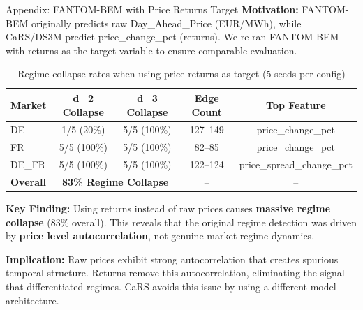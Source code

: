 \documentclass[aspectratio=169]{beamer}
\begin{document}
\begin{frame}{Appendix: FANTOM-BEM with Price Returns Target}
\textbf{Motivation:} FANTOM-BEM originally predicts raw Day\_Ahead\_Price (EUR/MWh), while CaRS/DS3M predict price\_change\_pct (returns). We re-ran FANTOM-BEM with returns as the target variable to ensure comparable evaluation.

\vspace{0.3cm}
\begin{table}
\centering
\scriptsize
\begin{tabular}{l|c|c|c|c}
\toprule
\textbf{Market} & \textbf{d=2 Collapse} & \textbf{d=3 Collapse} & \textbf{Edge Count} & \textbf{Top Feature} \\
\midrule
DE & 1/5 (20\%) & 5/5 (100\%) & 127--149 & price\_change\_pct \\
FR & 5/5 (100\%) & 5/5 (100\%) & 82--85 & price\_change\_pct \\
DE\_FR & 5/5 (100\%) & 5/5 (100\%) & 122--124 & price\_spread\_change\_pct \\
\midrule
\textbf{Overall} & \multicolumn{2}{c|}{\textbf{83\% Regime Collapse}} & -- & -- \\
\bottomrule
\end{tabular}
\caption{Regime collapse rates when using price returns as target (5 seeds per config)}
\end{table}

\vspace{0.2cm}
\textbf{Key Finding:} Using returns instead of raw prices causes \textbf{massive regime collapse} (83\% overall). This reveals that the original regime detection was driven by \textbf{price level autocorrelation}, not genuine market regime dynamics.

\vspace{0.2cm}
{\scriptsize \textbf{Implication:} Raw prices exhibit strong autocorrelation that creates spurious temporal structure. Returns remove this autocorrelation, eliminating the signal that differentiated regimes. CaRS avoids this issue by using a different model architecture.}
\end{frame}
\end{document}
